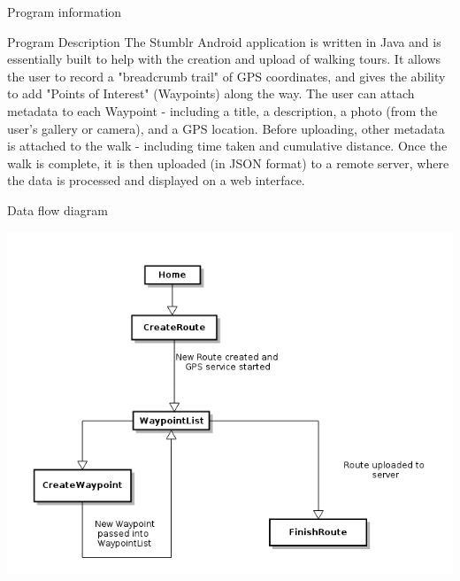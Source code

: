 \documentclass{article}
\begin{document}
	\newpage
	\begin{section}{Program information}
		\begin{subsection}{Program Description}
			The Stumblr Android application is written in Java and is essentially built to help with the creation and upload of walking tours. It allows the user to record a "breadcrumb trail" of GPS coordinates, and gives the ability to add "Points of Interest" (Waypoints) along the way. The user can attach metadata to each Waypoint - including a title, a description, a photo (from the user's gallery or camera), and a GPS location.  Before uploading, other metadata is attached to the walk - including time taken and cumulative distance. Once the walk is complete, it is then uploaded (in JSON format) to a remote server, where the data is processed and displayed on a web interface.
		\end{subsection}
		
		\vspace{0.5in}
		\begin{subsection}{Data flow diagram}
			\begin{center}
				\includegraphics[width=\columnwidth]{img/data_flow}
			\end{center}
		\end{subsection}
	\end{section}
	
\end{document}
